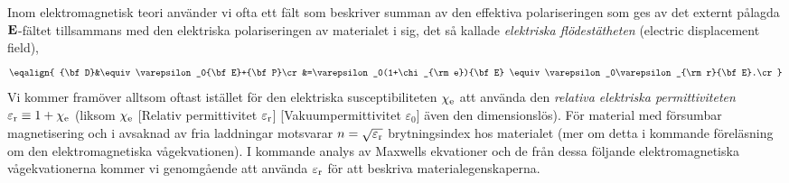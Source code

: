 {{{{{Inom elektromagnetisk teori anv{\"a}nder vi ofta ett f{\"a}lt som beskriver
summan av den effektiva polariseringen som ges av det externt p{\aa}lagda
${\bf E}$-f{\"a}ltet tillsammans med den elektriska polariseringen av
materialet i sig, det s{\aa} kallade {\it elektriska fl{\"o}dest{\"a}theten}
(electric displacement field),
$$
  \eqalign{
    {\bf D}&\equiv\varepsilon_0{\bf E}+{\bf P}\cr
      &=\varepsilon_0(1+\chi_{\rm e}){\bf E}
       \equiv\varepsilon_0\varepsilon_{\rm r}{\bf E}.\cr
  }
$$
Vi kommer fram{\"o}ver alltsom oftast ist{\"a}llet f{\"o}r den elektriska
susceptibiliteten $\chi_{\rm e}$ att anv{\"a}nda den {\it relativa elektriska
permittiviteten} $\varepsilon_{\rm r}\equiv 1+\chi_{\rm e}$ (liksom
$\chi_{\rm e}$
[Relativ permittivitet $\varepsilon_{\rm r}$]
[Vakuumpermittivitet $\varepsilon_0$]
{\"a}ven den dimensionsl{\"o}s). F{\"o}r material med
f{\"o}rsumbar magnetisering och i avsaknad av fria laddningar motsvarar
$n=\sqrt{\varepsilon_{\rm r}}$ brytningsindex hos materialet (mer om detta
i kommande f{\"o}rel{\"a}sning om den elektromagnetiska v{\aa}gekvationen).
I kommande analys av Maxwells ekvationer och de fr{\aa}n dessa f{\"o}ljande
elektromagnetiska v{\aa}gekvationerna kommer vi genomg{\aa}ende att anv{\"a}nda
$\varepsilon_{\rm r}$ f{\"o}r att beskriva materialegenskaperna.
\vfill\eject

}}}}}
